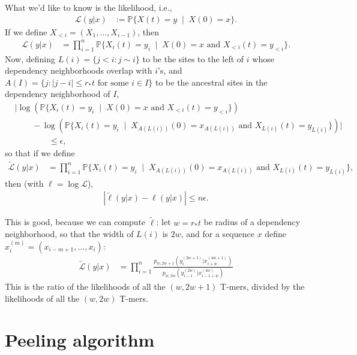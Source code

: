 \documentclass{article}
\renewcommand{\P}{\mathbb{P}}
\newcommand{\st}{\colon}  %
\newcommand{\given}{\;\mid\;}
\newcommand{\like}{\mathcal L}
\newcommand{\loglike}{\ell}
\newcommand{\alike}{\widetilde{\like}}
\newcommand{\aloglike}{\widetilde{\loglike}}
\theoremstyle{plain}
\theoremstyle{definition}
\begin{document}
What we'd like to know is the likelihood, i.e.,
\begin{align}
    \like(y|x)
    &:=
    \P\{ X(t) = y \given X(0) = x \} .
\end{align}
If we define $X_{<i}=(X_1, \ldots, X_{i-1})$, then
\begin{align}
    \like(y|x)
    &=
    \prod_{i=1}^n
    \P\{ X_i(t) = y_i \given X(0) = x \text{ and } X_{<i}(t) = y_{<i} \} .
\end{align}
Now, defining $L(i) = \{ j < i \st j \sim i \}$
to be the sites to the left of $i$ whose dependency neighborhoods overlap with $i$'s,
and $A(I) = \{ j \st |j-i| \le r_*t \text{ for some } i \in I\}$
to be the ancestral sites in the dependency neighborhood of $I$,
\begin{align}
&\big|
    \log( \P\{ X_i(t) = y_i \given X(0) = x \text{ and } X_{<i}(t) = y_{<i} \} ) \\
& \qquad {} -
    \log( \P\{ X_i(t) = y_i \given X_{A(L(i))}(0) = x_{A(L(i))} \text{ and } X_{L(i)}(t) = y_{L(i)} \} )
 \big| \\
&\qquad \qquad \le
    \epsilon ,
\end{align}
so that if we define
\begin{align}
    \alike(y|x)
    &=
    \prod_{i=1}^n
    \P\{ X_i(t) = y_i \given X_{A(L(i))}(0) = x_{A(L(i))} \text{ and } X_{L(i)}(t) = y_{L(i)} \} ,
\end{align}
then (with $\loglike = \log \like$),
\begin{align}
    \left| \aloglike(y|x) - \loglike(y|x) \right|
    \le n \epsilon .
\end{align}

This is good, because we can compute $\aloglike$:
let $w=r_*t$ be radius of a dependency neighborhood,
so that the width of $L(i)$ is $2w$,
and for a sequence $x$ define $x^{(m)}_i = (x_{i-m+1}, \ldots, x_i)$:
\begin{align}
    \alike(y|x)
    &=
    \prod_{i=1}^n
    \frac{
        p_{w,2w+1}(y^{(2w+1)}_i|x^{(4w+1)}_{i+w})
    }{
        p_{w,2w}(y^{(2w)}_{i-1}|x^{(4w)}_{i-1+w})
    }
\end{align}
This is the ratio of the likelihoods of all the $(w,2w+1)$ T-mers,
divided by the likelihoods of all the $(w,2w)$ T-mers.




\section{Peeling algorithm}
\label{ss:peeling_algorithm}
\end{document}
